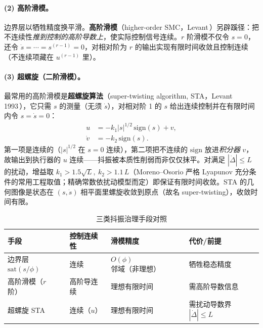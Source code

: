 \paragraph{(2) 高阶滑模。}
边界层以牺牲精度换平滑。\textbf{高阶滑模}（higher-order SMC，Levant\,\cite{levant1993sliding}）另辟蹊径：把不连续性\emph{推到控制的高阶导数上}，使实际控制信号连续。$r$ 阶滑模不仅令 $s=0$，还令 $\dot s=\cdots=s^{(r-1)}=0$，对相对阶为 $r$ 的输出实现有限时间收敛且控制连续（不连续项藏在 $u^{(r-1)}$ 里）。

\paragraph{(3) 超螺旋（二阶滑模）。}
最常用的高阶滑模是\textbf{超螺旋算法}（super-twisting algorithm, STA，Levant 1993\,\cite{levant1993sliding}），它只需 $s$ 的测量（无须 $\dot s$），对相对阶 1 的 $s$ 给出连续控制并在有限时间内令 $s=\dot s=0$：
\begin{align}
  u&=-k_1|s|^{1/2}\,\mathrm{sign}(s)+v,\label{eq:sta-u}\\
  \dot v&=-k_2\,\mathrm{sign}(s).\label{eq:sta-v}
\end{align}
第一项是连续的（$|s|^{1/2}$ 在 $s=0$ 连续），第二项把不连续的 $\mathrm{sign}$ 放进\emph{积分器} $v$，故输出到执行器的 $u$ 连续——抖振被本质性削弱而非仅仅抹平。对满足 $|\dot\Delta|\le L$ 的扰动，增益取 $k_1>1.5\sqrt L,\ k_2>1.1\,L$（Moreno--Osorio 严格 Lyapunov 充分条件的常用工程取值；精确常数依扰动模型而定）即保证有限时间收敛。STA 的几何图像是状态在 $(s,\dot s)$ 相平面里螺旋收敛到原点（故名 super-twisting），收敛时间有限。

\begin{table}[H]\centering\small
\caption{三类抖振治理手段对照}
\label{tab:smc-chatter}
\begin{tabular}{llll}
\toprule
手段 & 控制连续性 & 滑模精度 & 代价/前提 \\
\midrule
边界层 $\mathrm{sat}(s/\phi)$ & 连续 & $O(\phi)$ 邻域（非理想） & 牺牲稳态精度 \\
高阶滑模（$r$ 阶） & 高阶导连续 & 理想有限时间 & 需高阶导数信息 \\
超螺旋 STA & 连续（$u$） & 理想有限时间 & 需扰动导数界 $|\dot\Delta|\le L$ \\
\bottomrule
\end{tabular}
\end{table}

